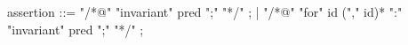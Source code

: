 \begin{syntax}
  assertion ::= "/*@" "invariant" pred ";" "*/" ;
  | "/*@" "for" id ("," id)* ":" "invariant" pred ";" "*/" ;
\end{syntax}
